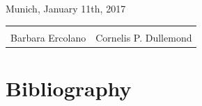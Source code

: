 \documentclass[10pt,fleqn,twoside]{article}
\begin{document}
\vfill

\noindent Munich, January 11th, 2017\\[1em]

\noindent\begin{tabular}{p{8.5cm}p{8.5cm}}
\mbox{}\vspace{5em}\mbox{} & \\
Barbara Ercolano & Cornelis P. Dullemond \\
\end{tabular}
% 



%
\pagebreak[4]

%


\section{Bibliography}

\begingroup
\renewcommand{\section}[2]{}%


\endgroup
\end{document}
